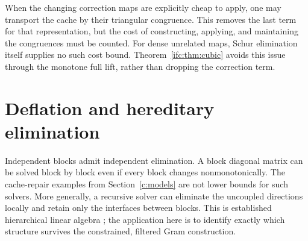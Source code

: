 \documentclass[11pt]{amsart}
\theoremstyle{definition}\newtheorem{definition}[theorem]{Definition}
\theoremstyle{remark}\newtheorem{remark}[theorem]{Remark}
\numberwithin{equation}{section}
\begin{document}
When the changing correction maps are explicitly cheap to apply,
one may transport the cache by their triangular congruence. This
removes the last term for that representation, but the cost of
constructing, applying, and maintaining the congruences must be counted.
For dense unrelated maps, Schur elimination itself supplies no such
cost bound. Theorem~\ref{ifc:thm:cubic} avoids this issue through the
monotone full lift, rather than dropping the correction term.

\section{Deflation and hereditary elimination}
\label{ifc:sec:tree}

Independent blocks admit independent elimination. A block diagonal matrix
can be solved block by block even if every block changes nonmonotonically.
The cache-repair examples from Section~\ref{c:models} are not lower bounds
for such solvers. More generally, a recursive solver can eliminate the
uncoupled directions locally and retain only the interfaces between
blocks. This is established hierarchical linear algebra
\cite{ulv,hierarchical}; the application here is to identify exactly
which structure survives the constrained, filtered Gram construction.
\end{document}
